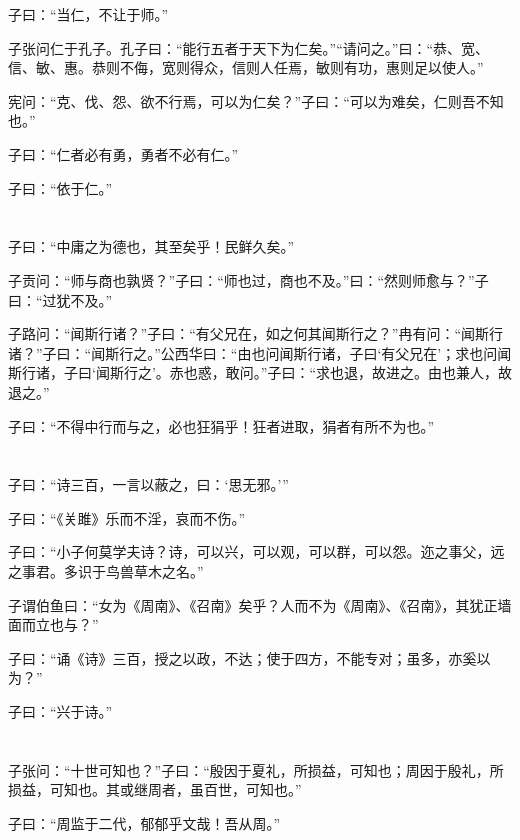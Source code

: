 \documentclass[a5paper]{ctexbook}
\begin{document}
    子曰：“当仁，不让于师。”

    子张问仁于孔子。孔子曰：“能行五者于天下为仁矣。”“请问之。”曰：“恭、宽、信、敏、惠。恭则不侮，宽则得众，信则人任焉，敏则有功，惠则足以使人。”

    宪问：“克、伐、怨、欲不行焉，可以为仁矣？”子曰：“可以为难矣，仁则吾不知也。”

    子曰：“仁者必有勇，勇者不必有仁。”

    子曰：“依于仁。”

    \chapter{}

    子曰：“中庸之为德也，其至矣乎！民鲜久矣。”

    子贡问：“师与商也孰贤？”子曰：“师也过，商也不及。”曰：“然则师愈与？”子曰：“过犹不及。”

    子路问：“闻斯行诸？”子曰：“有父兄在，如之何其闻斯行之？”冉有问：“闻斯行诸？”子曰：“闻斯行之。”公西华曰：“由也问闻斯行诸，子曰‘有父兄在’；求也问闻斯行诸，子曰‘闻斯行之’。赤也惑，敢问。”子曰：“求也退，故进之。由也兼人，故退之。”

    子曰：“不得中行而与之，必也狂狷乎！狂者进取，狷者有所不为也。”

    \chapter{}

    子曰：“诗三百，一言以蔽之，曰：‘思无邪。’”

    子曰：“《关雎》乐而不淫，哀而不伤。”

    子曰：“小子何莫学夫诗？诗，可以兴，可以观，可以群，可以怨。迩之事父，远之事君。多识于鸟兽草木之名。”

    子谓伯鱼曰：“女为《周南》、《召南》矣乎？人而不为《周南》、《召南》，其犹正墙面而立也与？”

    子曰：“诵《诗》三百，授之以政，不达；使于四方，不能专对；虽多，亦奚以为？”

    子曰：“兴于诗。”

    \chapter{}

    子张问：“十世可知也？”子曰：“殷因于夏礼，所损益，可知也；周因于殷礼，所损益，可知也。其或继周者，虽百世，可知也。”

    子曰：“周监于二代，郁郁乎文哉！吾从周。”
\end{document}
